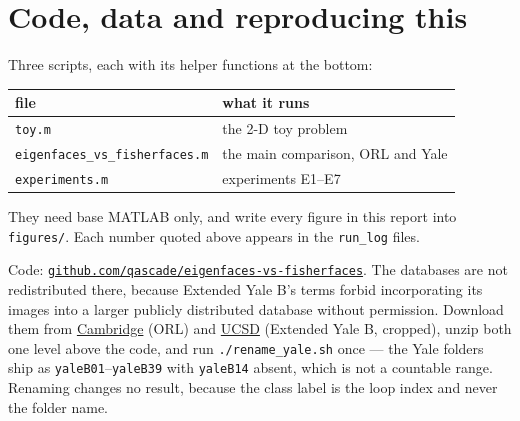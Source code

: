 \documentclass[11pt]{article}
\theoremstyle{remark}
\begin{document}
\section*{Code, data and reproducing this}

Three scripts, each with its helper functions at the bottom:

\begin{center}\small
\begin{tabular}{ll}
\toprule
file & what it runs \\
\midrule
\texttt{toy.m}                       & the 2-D toy problem \\
\texttt{eigenfaces\_vs\_fisherfaces.m} & the main comparison, ORL and Yale \\
\texttt{experiments.m}               & experiments E1--E7 \\
\bottomrule
\end{tabular}
\end{center}

\noindent They need base MATLAB only, and write every figure in this report
into \texttt{figures/}. Each number quoted above appears in the
\texttt{run\_log} files.

Code: \href{https://github.com/qascade/eigenfaces-vs-fisherfaces}{\texttt{github.com/qascade/eigenfaces-vs-fisherfaces}}.
The databases are not redistributed there, because Extended Yale B's terms
forbid incorporating its images into a larger publicly distributed database
without permission. Download them from
\href{https://www.cl.cam.ac.uk/research/dtg/attarchive/facedatabase.html}{Cambridge}
(ORL) and
\href{https://datarepo.eng.ucsd.edu/visiondata/iskwak/public_html/ExtYaleDatabase/ExtYaleB.html}{UCSD}
(Extended Yale B, cropped), unzip both one level above the code, and run
\texttt{./rename\_yale.sh} once --- the Yale folders ship as
\texttt{yaleB01}--\texttt{yaleB39} with \texttt{yaleB14} absent, which is not a
countable range. Renaming changes no result, because the class label is the
loop index and never the folder name.
\end{document}
